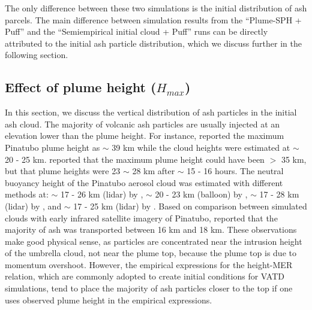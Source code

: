 \documentclass[utf8]{frontiersSCNS} %
\begin{document}
The only difference between these two simulations is the initial distribution of ash parcels. The main difference between simulation results from the ``Plume-SPH + Puff'' and the ``Semiempirical initial cloud + Puff'' runs can be directly attributed to the initial ash particle distribution, which we discuss further in the following section.

\subsection{Effect of plume height ($H_{max}$)}

In this section, we discuss the vertical distribution of ash particles in the initial ash cloud.
The majority of volcanic ash particles are usually  injected at an elevation lower than the plume height. For instance, \citet{holasek1996satellite, holasek1996experiments} reported the maximum Pinatubo plume height as $\sim$ 39 km while the cloud heights were estimated at $\sim$ 20 - 25 km. \citet{self1993atmospheric} reported that the maximum plume height could have been $>$ 35 km, but that plume heights were 23 $\sim$ 28 km after $\sim$ 15 - 16 hours. The neutral buoyancy height of the Pinatubo aerosol cloud was estimated with different methods at: $\sim$ 17 - 26 km (lidar) by \citet{defoor1992early}, $\sim$ 20 - 23 km (balloon) by \citet{deshler1992balloonborne}, $\sim$ 17 - 28 km (lidar) by \citet{jager1992pinatubo}, and $\sim$ 17 - 25 km (lidar) by \citet{avdyushin19931}. Based on comparison between simulated clouds with early infrared satellite imagery of Pinatubo, \citet{fero2008simulation} reported that the majority of ash was transported between 16 km and 18 km. These observations make good physical sense, as particles are concentrated near the intrusion height of the umbrella cloud, not near the plume top, because the plume top is due to momentum overshoot. However, the empirical expressions for the height-MER relation, which are commonly adopted to create initial conditions for VATD simulations, tend to place the majority of ash particles closer to the top if one uses observed plume height in the empirical expressions.
\end{document}
